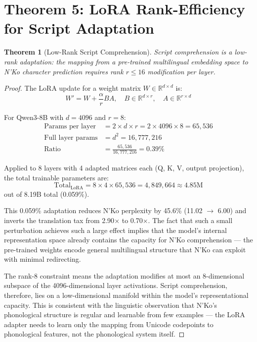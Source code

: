\documentclass[11pt]{article}
\newtheorem{theorem}{Theorem}
\theoremstyle{remark}
\begin{document}
\section{Theorem 5: LoRA Rank-Efficiency for Script Adaptation}

\begin{theorem}[Low-Rank Script Comprehension]
Script comprehension is a low-rank adaptation: the mapping from a pre-trained multilingual embedding space to N'Ko character prediction requires rank $r \leq 16$ modification per layer.
\end{theorem}

\begin{proof}
The LoRA update for a weight matrix $W \in \mathbb{R}^{d \times d}$ is:
\begin{equation}
W' = W + \frac{\alpha}{r} BA, \quad B \in \mathbb{R}^{d \times r}, \quad A \in \mathbb{R}^{r \times d}
\end{equation}

For Qwen3-8B with $d = 4096$ and $r = 8$:
\begin{align}
\text{Params per layer} &= 2 \times d \times r = 2 \times 4096 \times 8 = 65{,}536 \\
\text{Full layer params} &= d^2 = 16{,}777{,}216 \\
\text{Ratio} &= \frac{65{,}536}{16{,}777{,}216} = 0.39\%
\end{align}

Applied to 8 layers with 4 adapted matrices each (Q, K, V, output projection), the total trainable parameters are:
\begin{equation}
\text{Total}_{\text{LoRA}} = 8 \times 4 \times 65{,}536 = 4{,}849{,}664 \approx 4.85\text{M}
\end{equation}
out of 8.19B total (0.059\%).

This 0.059\% adaptation reduces N'Ko perplexity by 45.6\% (11.02 $\to$ 6.00) and inverts the translation tax from 2.90$\times$ to 0.70$\times$. The fact that such a small perturbation achieves such a large effect implies that the model's internal representation space already contains the capacity for N'Ko comprehension --- the pre-trained weights encode general multilingual structure that N'Ko can exploit with minimal redirecting.

The rank-8 constraint means the adaptation modifies at most an 8-dimensional subspace of the 4096-dimensional layer activations. Script comprehension, therefore, lies on a low-dimensional manifold within the model's representational capacity. This is consistent with the linguistic observation that N'Ko's phonological structure is regular and learnable from few examples --- the LoRA adapter needs to learn only the mapping from Unicode codepoints to phonological features, not the phonological system itself.
\end{proof}
\end{document}
